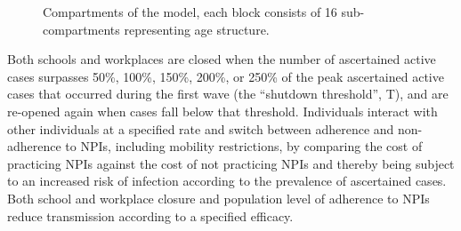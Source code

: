 \begin{figure}
  \begin{center}
  \end{center}

  \caption{Compartments of the model, each block consists of 16 sub-compartments representing age structure.}
\end{figure}

Both schools and workplaces are closed when the number of ascertained active cases surpasses 50\%, 100\%, 150\%, 200\%, or 250\% of the peak ascertained active cases that occurred during the first wave (the “shutdown threshold”, T), and are re-opened again when cases fall below that threshold. Individuals interact with other individuals at a specified rate and switch between adherence and non-adherence to NPIs, including mobility restrictions, by comparing the cost of practicing NPIs against the cost of not practicing NPIs and thereby being subject to an increased risk of infection according to the prevalence of ascertained cases.  Both school and workplace closure and population level of adherence to NPIs reduce transmission according to a specified efficacy. 



